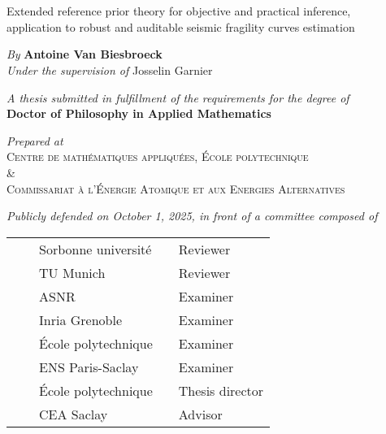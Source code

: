 \documentclass[a4paper]{book}
\renewcommand{\familydefault}{\sfdefault}
\begin{document}
\pagestyle{empty}

\ 
\newpage 
\normalsize
\renewcommand{\familydefault}{\rmdefault}
\normalfont
{
\centering
\ 
\vfill

\vspace*{0.5cm}\huge\textcolor{niceBlue}{Extended reference prior theory for objective and practical
inference,\\
application to robust and auditable seismic fragility
curves estimation}\vfill

\large



  \emph{By} \textbf{Antoine Van Biesbroeck}\\[3pt]
  \emph{Under the supervision of} {{Josselin Garnier}}  

\vfill


\emph{A thesis submitted in fulfillment of the requirements for the degree of}\\[3pt]
\textbf{Doctor of
Philosophy in Applied Mathematics} \vfill




\emph{Prepared at}\\[3pt]
\textsc{Centre de mathématiques appliquées, École polytechnique\\ \&\\
Commissariat à l'Énergie Atomique et aux Energies Alternatives}


\vfill



  \emph{Publicly defended on October 1, 2025,
in front of a committee composed of}\vspace*{10pt}
    \begin{tabular}{l p{1cm} l p{1cm} l}
      \jurynameA  && Sorbonne université && Reviewer \\
      \jurynameB  && TU Munich && Reviewer \\
      \jurynameC  && ASNR && Examiner \\
      \jurynameD  && Inria Grenoble && Examiner \\
      \jurynameE  && École polytechnique && Examiner \\
      \jurynameF  && ENS Paris-Saclay && Examiner \\
      \jurynameG  && École polytechnique && Thesis director \\
      \jurynameH  && CEA Saclay && Advisor %
    \end{tabular} 




}
\end{document}

